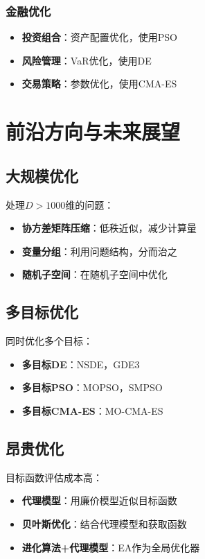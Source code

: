 \subsubsection{金融优化}

\begin{itemize}
    \item \textbf{投资组合}：资产配置优化，使用PSO
    \item \textbf{风险管理}：VaR优化，使用DE
    \item \textbf{交易策略}：参数优化，使用CMA-ES
\end{itemize}

\section{前沿方向与未来展望}

\subsection{大规模优化}

处理$D > 1000$维的问题：
\begin{itemize}
    \item \textbf{协方差矩阵压缩}：低秩近似，减少计算量
    \item \textbf{变量分组}：利用问题结构，分而治之
    \item \textbf{随机子空间}：在随机子空间中优化
\end{itemize}

\subsection{多目标优化}

同时优化多个目标：
\begin{itemize}
    \item \textbf{多目标DE}：NSDE，GDE3
    \item \textbf{多目标PSO}：MOPSO，SMPSO
    \item \textbf{多目标CMA-ES}：MO-CMA-ES
\end{itemize}

\subsection{昂贵优化}

目标函数评估成本高：
\begin{itemize}
    \item \textbf{代理模型}：用廉价模型近似目标函数
    \item \textbf{贝叶斯优化}：结合代理模型和获取函数
    \item \textbf{进化算法+代理模型}：EA作为全局优化器
\end{itemize}

